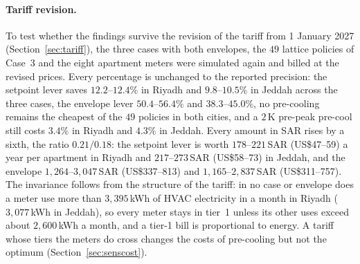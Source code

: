 \documentclass[10pt,a4paper,twocolumn]{article}
\theoremstyle{definition}
\begin{document}
\paragraph{Tariff revision.}\label{sec:tariffrev} To test whether the findings survive the revision of the tariff from 1 January 2027 (Section~\ref{sec:tariff}), the three cases with both envelopes, the $49$ lattice policies of Case~3 and the eight apartment meters were simulated again and billed at the revised prices. Every percentage is unchanged to the reported precision: the setpoint lever saves $12.2$--$12.4\%$ in Riyadh and $9.8$--$10.5\%$ in Jeddah across the three cases, the envelope lever $50.4$--$56.4\%$ and $38.3$--$45.0\%$, no pre-cooling remains the cheapest of the $49$ policies in both cities, and a $2\,$K pre-peak pre-cool still costs $3.4\%$ in Riyadh and $4.3\%$ in Jeddah. Every amount in SAR rises by a sixth, the ratio $0.21/0.18$: the setpoint lever is worth $178$--$221\,$SAR (US\$47--59) a year per apartment in Riyadh and $217$--$273\,$SAR (US\$58--73) in Jeddah, and the envelope $1{,}264$--$3{,}047\,$SAR (US\$337--813) and $1{,}165$--$2{,}837\,$SAR (US\$311--757). The invariance follows from the structure of the tariff: in no case or envelope does a meter use more than $3{,}395\,$kWh of HVAC electricity in a month in Riyadh ($3{,}077\,$kWh in Jeddah), so every meter stays in tier~1 unless its other uses exceed about $2{,}600\,$kWh a month, and a tier-1 bill is proportional to energy. A tariff whose tiers the meters do cross changes the costs of pre-cooling but not the optimum (Section~\ref{sec:senscost}).
\end{document}
